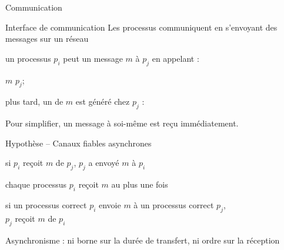 
\begingroup

\begin{frame}{Communication}

  \vspace{-2mm}
  \begin{block}{Interface de communication}
    Les processus communiquent en s'envoyant des messages sur un réseau
    \begin{description}[Réception :]
      \item[Émission :]  un processus $p_i$ peut  un message $m$ à $p_j$ en appelant :
      \begin{algorithm}[H]
        \Send $m$ \To $p_j$; 
      \end{algorithm}
      \item[Réception :] plus tard, un  de $m$ est généré chez $p_j$ :
        \begin{algorithm}[H]
      \end{algorithm}
    \end{description}
    Pour simplifier, un message à soi-même est reçu immédiatement. 
  \end{block}
  
  \vspace{-2mm}
  \begin{block}{Hypothèse -- Canaux fiables asynchrones}
    \begin{description}[Réception :]
    \item[Validité :] si $p_i$ reçoit $m$ de $p_j$, $p_j$ a envoyé $m$ à $p_i$
    \item[Intégrité :] chaque processus $p_i$ reçoit $m$ au plus une fois
    \item[Fiabilité :] si un processus correct $p_i$ envoie $m$ à un processus correct $p_j$, \\
      $p_j$ reçoit $m$ de $p_i$
    \end{description}
    \alert{Asynchronisme :} ni borne sur la durée de transfert, ni ordre sur la réception
  \end{block}
  
\end{frame}

\endgroup
\endinput


